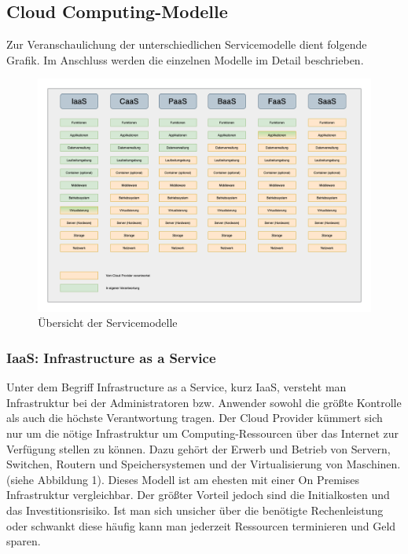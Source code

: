 \clearpage

\subsection{Cloud Computing-Modelle}
Zur Veranschaulichung der unterschiedlichen Servicemodelle dient folgende Grafik.
Im Anschluss werden die einzelnen Modelle im Detail beschrieben.


\begin{figure}[htbp]
    \centering
    \includegraphics[width=1.0\textwidth]{30-Serverless-Theorie/ServiceModelle.png}
    \caption{Übersicht der Servicemodelle}
    \label{fig:meine-grafik}
\end{figure}


   \subsubsection{IaaS: Infrastructure as a Service}
   Unter dem Begriff Infrastructure as a Service, kurz IaaS, versteht man Infrastruktur bei der Administratoren bzw. Anwender sowohl die größte Kontrolle als auch die höchste Verantwortung tragen.
   Der Cloud Provider kümmert sich nur um die nötige Infrastruktur um Computing-Ressourcen über das Internet zur Verfügung stellen zu können.
   Dazu gehört der Erwerb und Betrieb von Servern, Switchen, Routern und Speichersystemen und der Virtualisierung von Maschinen.(siehe Abbildung 1).
   Dieses Modell ist am ehesten mit einer On Premises Infrastruktur vergleichbar.
   Der größter Vorteil jedoch sind die Initialkosten und das Investitionsrisiko.
   Ist man sich unsicher über die benötigte Rechenleistung oder schwankt diese häufig kann man jederzeit Ressourcen terminieren und Geld sparen.

